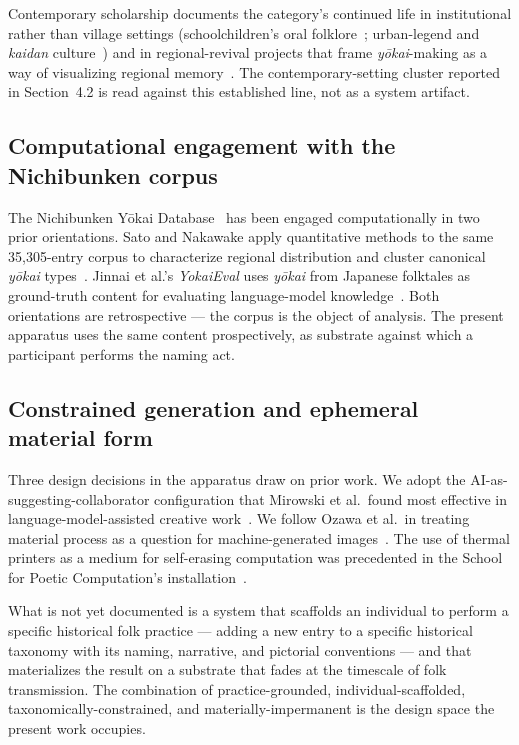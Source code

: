 \documentclass[manuscript,review,anonymous,nonacm]{acmart}
\begin{document}
Contemporary scholarship documents the category's continued life in institutional rather than village settings (schoolchildren's oral folklore~\cite{tsunemitsu1993}; urban-legend and \textit{kaidan} culture~\cite{iikura2025}) and in regional-revival projects that frame \textit{y\=okai}-making as a way of visualizing regional memory~\cite{ichikawa2014}. The contemporary-setting cluster reported in Section~4.2 is read against this established line, not as a system artifact.

\subsection{Computational engagement with the Nichibunken corpus}

The Nichibunken Y\=okai Database~\cite{nichibunken_db} has been engaged computationally in two prior orientations. Sato and Nakawake apply quantitative methods to the same 35{,}305-entry corpus to characterize regional distribution and cluster canonical \textit{y\=okai} types~\cite{sato2020}. Jinnai et al.'s \textit{YokaiEval} uses \textit{y\=okai} from Japanese folktales as ground-truth content for evaluating language-model knowledge~\cite{jinnai2025}. Both orientations are retrospective — the corpus is the object of analysis. The present apparatus uses the same content prospectively, as substrate against which a participant performs the naming act.

\subsection{Constrained generation and ephemeral material form}

Three design decisions in the apparatus draw on prior work. We adopt the AI-as-suggesting-collaborator configuration that Mirowski et al.\ found most effective in language-model-assisted creative work~\cite{mirowski2023}. We follow Ozawa et al.\ in treating material process as a question for machine-generated images~\cite{ozawa2024}. The use of thermal printers as a medium for self-erasing computation was precedented in the School for Poetic Computation's installation~\cite{sfpc_decay}.

What is not yet documented is a system that scaffolds an individual to perform a specific historical folk practice — adding a new entry to a specific historical taxonomy with its naming, narrative, and pictorial conventions — and that materializes the result on a substrate that fades at the timescale of folk transmission. The combination of practice-grounded, individual-scaffolded, taxonomically-constrained, and materially-impermanent is the design space the present work occupies.
\end{document}
